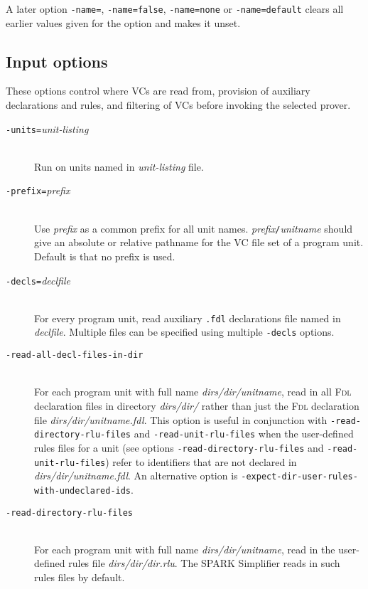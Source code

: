\documentclass[12pt,fleqn]{article}
\newcommand{\fdl}{\textsc{Fdl}}
\newcommand{\optionb}[1]{\item[\texttt{-{#1}}]\ \\}
\newcommand{\optionv}[2]{\item[\texttt{-{#1}=}\mdseries\textit{#2}]\ \\}
\begin{document}
A later option 
\texttt{-name=},
\texttt{-name=false},
\texttt{-name=none} or 
\texttt{-name=default}
clears all earlier values given for the option and makes it unset.

\subsection{Input options}

These options control where VCs are read from, provision of auxiliary
declarations and rules, and filtering of VCs before invoking the selected
prover.

\begin{description}

  \optionv{units}{unit-listing}  Run on units named in \textit{unit-listing}
   file.

  \optionv{prefix}{prefix} 
    Use \textit{prefix} as a common prefix for all unit names.  
    \textit{prefix}\texttt{/}\textit{unitname} should give an absolute or
    relative pathname for the VC file set of a program unit.  Default is
    that no prefix is used.
   
  \optionv{decls}{declfile}
    For every program unit, read auxiliary \texttt{.fdl} 
    declarations file named in \textit{declfile}.  
    Multiple files can be specified using multiple 
    \texttt{-decls} options.

  \optionb{read-all-decl-files-in-dir}
  For each program unit with full name \textit{dirs/dir/unitname},
  read in all \fdl{} declaration files in directory \textit{dirs/dir/} rather
  than just the \fdl{} declaration file \textit{dirs/dir/unitname.fdl}.
  This option is useful in conjunction with 
  \texttt{-read-directory-rlu-files}
  and \texttt{-read-unit-rlu-files} when the user-defined rules files for a
  unit 
  (see options \texttt{-read-directory-rlu-files} 
   and \texttt{-read-unit-rlu-files})
  refer to identifiers that are not declared in \textit{dirs/dir/unitname.fdl}.
  An alternative option is \texttt{-expect-dir-user-rules-with-undeclared-ids}.

  \optionb{read-directory-rlu-files}
  For each program unit with full name \textit{dirs/dir/unitname},
  read in the user-defined rules file \textit{dirs/dir/dir.rlu}.  The SPARK
  Simplifier reads in such rules files by default.


\end{description}
\end{document}
